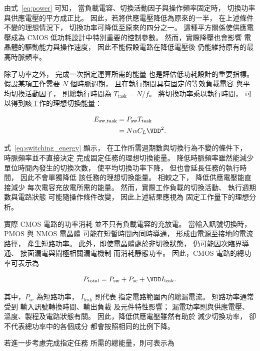 由式~\eqref{eq:power} 可知，
當負載電容、切換活動因子與操作頻率固定時，
切換功率與供應電壓的平方成正比。
因此，若將供應電壓降低為原來的一半，
在上述條件不變的理想情況下，
切換功率可降低至原來的四分之一。
這種平方關係使供應電壓成為 CMOS
低功耗設計中特別重要的控制參數。
然而，實際降壓也會影響
電晶體的驅動能力與操作速度，
因此不能假設電路在降低電壓後
仍能維持原有的最高時脈頻率。

除了功率之外，
完成一次指定運算所需的能量
也是評估低功耗設計的重要指標。
假設某項工作需要 $N$ 個時脈週期，
且在執行期間具有固定的等效負載電容
與平均切換活動因子，
則總執行時間為
$T_{\mathrm{task}}=N/f$。
將切換功率乘以執行時間，
可以得到該工作的理想切換能量：

\begin{equation}
\begin{aligned}
E_{\mathrm{sw,task}}
&=P_{\mathrm{sw}}T_{\mathrm{task}}\\
&=N\alpha C_L\VDD^2.
\end{aligned}
\label{eq:switching_energy}
\end{equation}

式~\eqref{eq:switching_energy} 顯示，
在工作所需週期數與切換行為不變的條件下，
時脈頻率並不直接決定
完成固定任務的理想切換能量。
降低時脈頻率雖然能減少
單位時間內發生的切換次數，
使平均切換功率下降，
但也會延長任務的執行時間，
因此不會單獨降低
該任務的理想切換能量。
相較之下，
降低供應電壓能直接減少
每次電容充放電所需的能量。
然而，實際工作負載的切換活動、
執行週期數與電路狀態
可能隨操作條件改變，
因此上述結果應視為
固定工作量下的理想分析。

實際 CMOS 電路的功率消耗
並不只有負載電容的充放電。
當輸入訊號切換時，
PMOS 與 NMOS 電晶體
可能在短暫時間內同時導通，
形成由電源至接地的電流路徑，
產生短路功率。
此外，即使電晶體處於非切換狀態，
仍可能因次臨界導通、
接面漏電與閘極相關漏電機制
而消耗靜態功率。
因此，CMOS 電路的總功率可表示為

\begin{equation}
P_{\mathrm{total}}
=P_{\mathrm{sw}}
+P_{\mathrm{sc}}
+\VDD I_{\mathrm{leak}}.
\label{eq:total_power}
\end{equation}

其中，$P_{\mathrm{sc}}$ 為短路功率，
$I_{\mathrm{leak}}$ 則代表
指定電路範圍內的總漏電流。
短路功率通常受到
輸入訊號轉換時間、輸出負載
及元件特性影響；
漏電功率則與供應電壓、
溫度、製程及電路狀態有關。
因此，降低供應電壓雖然有助於
減少切換功率，
卻不代表總功率中的各個成分
都會按照相同的比例下降。

若進一步考慮完成指定任務
所需的總能量，則可表示為

